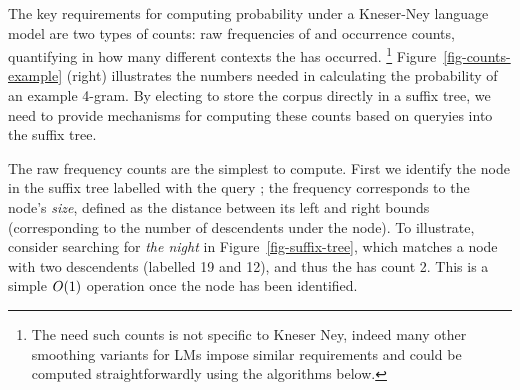 
The key requirements for computing probability under a Kneser-Ney language model are two types of counts: raw frequencies of \ngrams and occurrence counts, quantifying in how many different contexts the \ngram has occurred.%
\footnote{The need such counts is not specific to Kneser Ney, indeed
  many other smoothing variants for \ngram LMs impose similar
  requirements and could be computed straightforwardly using the algorithms below.}
Figure~\ref{fig-counts-example} (right) illustrates the numbers needed in calculating the probability of an example 4-gram.
By electing to store the corpus directly in a suffix tree, we need to provide mechanisms for computing these counts based on queryies into the suffix tree.

The raw frequency counts are the simplest to compute. First we
identify the node in the suffix tree labelled with the query
\ngram; the frequency corresponds to the node's \emph{size}, defined as the
distance between its left and right bounds (corresponding to the
number of descendents under the node). To illustrate, consider
searching for \emph{the night} in  Figure~\ref{fig-suffix-tree}, which
matches a node with two descendents (labelled 19 and 12), and thus the
\ngram has count 2. This is a simple $O(1)$ operation once the
node has been identified.

